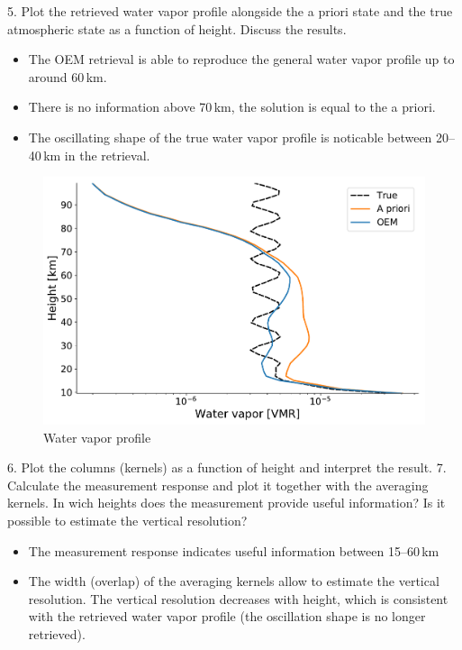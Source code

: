 \documentclass[paper=a4, fontsize=11pt]{scrartcl}
\begin{document}
\newpage

5. Plot the retrieved water vapor profile alongside the a priori state and the
true atmospheric state as a function of height. Discuss the results.
\begin{itemize}
  \item The OEM retrieval is able to reproduce the general water vapor profile
    up to around 60\,km.
  \item There is no information above 70\,km, the solution is equal to the a
    priori.
  \item The oscillating shape of the true water vapor profile is noticable
    between 20--40\,km in the retrieval.
\end{itemize}

\begin{figure}[ht]
  \centering
  \includegraphics[width=\textwidth]{plots/water_vapor_profile.pdf}
  \caption{Water vapor profile \label{fig:wv_profile}}
\end{figure}

\newpage

6. Plot the columns (kernels) as a function of height and interpret the result.
7. Calculate the measurement response and plot it together with the averaging
kernels. In wich heights does the measurement provide useful information? Is it
possible to estimate the vertical resolution?
\begin{itemize}
  \item The measurement response indicates useful information between
    15--60\,km
  \item The width (overlap) of the averaging kernels allow to estimate the
    vertical resolution. The vertical resolution decreases with height, which
    is consistent with the retrieved water vapor profile (the oscillation shape
    is no longer retrieved).
\end{itemize}
\end{document}
